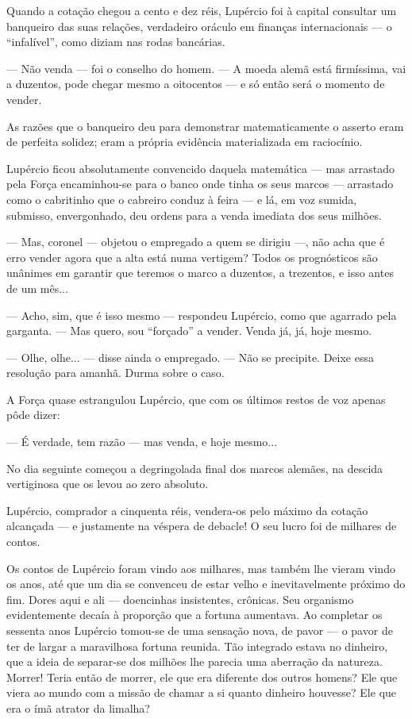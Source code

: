 Quando a cotação chegou a cento e dez réis, Lupércio foi à capital
consultar um banqueiro das suas relações, verdadeiro oráculo em finanças
internacionais --- o ``infalível'', como diziam nas rodas bancárias.

--- Não venda --- foi o conselho do homem. --- A moeda alemã está
firmíssima, vai a duzentos, pode chegar mesmo a oitocentos --- e só
então será o momento de vender.

As razões que o banqueiro deu para demonstrar matematicamente o asserto
eram de perfeita solidez; eram a própria evidência materializada em
raciocínio.

Lupércio ficou absolutamente convencido daquela matemática --- mas
arrastado pela Força encaminhou-se para o banco onde tinha os seus
marcos --- arrastado como o cabritinho que o cabreiro conduz à feira ---
e lá, em voz sumida, submisso, envergonhado, deu ordens para a venda
imediata dos seus milhões.

--- Mas, coronel --- objetou o empregado a quem se dirigiu ---, não acha
que é erro vender agora que a alta está numa vertigem? Todos os
prognósticos são unânimes em garantir que teremos o marco a duzentos, a
trezentos, e isso antes de um mês...

--- Acho, sim, que é isso mesmo --- respondeu Lupércio, como que
agarrado pela garganta. --- Mas quero, sou ``forçado'' a vender. Venda
já, já, hoje mesmo.

--- Olhe, olhe... --- disse ainda o empregado. --- Não se precipite.
Deixe essa resolução para amanhã. Durma sobre o caso.

A Força quase estrangulou Lupércio, que com os últimos restos de voz
apenas pôde dizer:

--- É verdade, tem razão --- mas venda, e hoje mesmo...

No dia seguinte começou a degringolada final dos marcos alemães, na
descida vertiginosa que os levou ao zero absoluto.

Lupércio, comprador a cinquenta réis, vendera-os pelo máximo da cotação
alcançada --- e justamente na véspera de debacle! O seu lucro foi de
milhares de contos.

Os contos de Lupércio foram vindo aos milhares, mas também lhe vieram
vindo os anos, até que um dia se convenceu de estar velho e
inevitavelmente próximo do fim. Dores aqui e ali --- doencinhas
insistentes, crônicas. Seu organismo evidentemente decaía à proporção
que a fortuna aumentava. Ao completar os sessenta anos Lupércio tomou-se
de uma sensação nova, de pavor --- o pavor de ter de largar a
maravilhosa fortuna reunida. Tão integrado estava no dinheiro, que a
ideia de separar-se dos milhões lhe parecia uma aberração da natureza.
Morrer! Teria então de morrer, ele que era diferente dos outros homens?
Ele que viera ao mundo com a missão de chamar a si quanto dinheiro
houvesse? Ele que era o ímã atrator da limalha?

